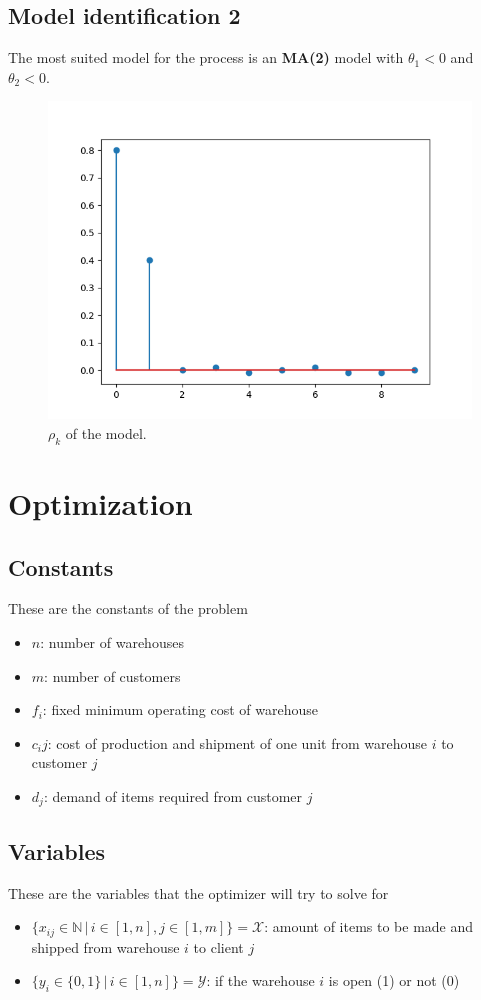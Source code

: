 \documentclass{assignment}
\begin{document}
\subsection{Model identification 2}
\noindent The most suited model for the process is an \textbf{MA(2)} model with $\theta_1 < 0$ and $\theta_2 < 0$.
\begin{figure}[H]
    \centering
    \includegraphics[width=0.5\linewidth]{Figuras/model-2.png}
    \caption{$\rho_k$ of the model.}
    \label{fig:enter-label}
\end{figure}


\section{Optimization}
\subsection{Constants} These are the constants of the problem
\begin{itemize}
    \item $n$: number of warehouses
    \item $m$: number of customers
    \item $f_i$: fixed minimum operating cost of warehouse
    \item $c_ij$: cost of production and shipment of one unit from warehouse $i$ to customer $j$
    \item $d_j$: demand of items required from customer $j$
\end{itemize}

\subsection{Variables} These are the variables that the optimizer will try to solve for
\begin{itemize}
    \item $\{x_{ij} \in \mathbb{N}\,|\,i \in [1,n], j \in [1,m]\} = \mathcal{X}$: amount of items to be made and shipped from warehouse $i$ to client $j$
    \item $\{y_i \in \{0,1\} \,|\,i \in [1,n] \} = \mathcal{Y}$: if the warehouse $i$ is open (1) or not (0)
\end{itemize}
\end{document}
